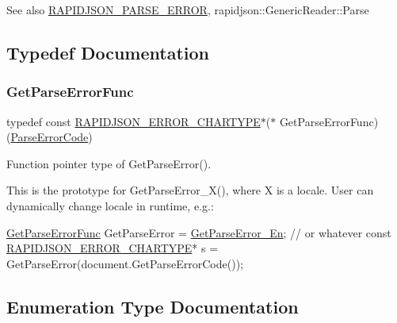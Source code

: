 \begin{DoxySeeAlso}{See also}
\hyperlink{a00635_gae3689840fa6e89a241313f33b602f865}{R\+A\+P\+I\+D\+J\+S\+O\+N\+\_\+\+P\+A\+R\+S\+E\+\_\+\+E\+R\+R\+OR}, rapidjson\+::\+Generic\+Reader\+::\+Parse 
\end{DoxySeeAlso}


\subsection{Typedef Documentation}
\mbox{\label{a00635_ga586548166441ab3ce30219cb35be2e04}} 
\subsubsection{\texorpdfstring{Get\+Parse\+Error\+Func}{GetParseErrorFunc}}
{\footnotesize\ttfamily typedef const \hyperlink{a00635_ga7e4636fd48d0148f102b8a13f0539d8c}{R\+A\+P\+I\+D\+J\+S\+O\+N\+\_\+\+E\+R\+R\+O\+R\+\_\+\+C\+H\+A\+R\+T\+Y\+PE}$\ast$($\ast$ Get\+Parse\+Error\+Func) (\hyperlink{a00635_ga8d4b32dfc45840bca189ade2bbcb6ba7}{Parse\+Error\+Code})}



Function pointer type of Get\+Parse\+Error(). 

This is the prototype for {\ttfamily Get\+Parse\+Error\+\_\+\+X()}, where {\ttfamily X} is a locale. User can dynamically change locale in runtime, e.\+g.\+: 
\begin{DoxyCode}
\hyperlink{a00635_ga586548166441ab3ce30219cb35be2e04}{GetParseErrorFunc} GetParseError = \hyperlink{a00635_ga755b523205f46c980c80d12e230a3abd}{GetParseError\_En}; \textcolor{comment}{// or whatever}
\textcolor{keyword}{const} \hyperlink{a00635_ga7e4636fd48d0148f102b8a13f0539d8c}{RAPIDJSON\_ERROR\_CHARTYPE}* s = GetParseError(document.GetParseErrorCode());
\end{DoxyCode}
 

\subsection{Enumeration Type Documentation}
\mbox{\label{a00635_ga8d4b32dfc45840bca189ade2bbcb6ba7}} 
